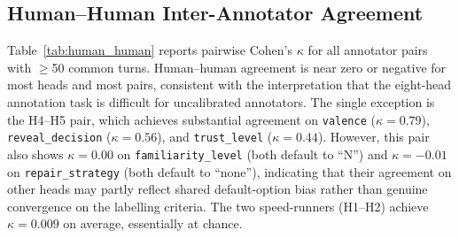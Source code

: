\documentclass[11pt]{article}
\begin{document}
\begin{table}[tp]
\centering
\caption{Per-annotator human--LLM-label agreement ($\kappa$). H1--H4 annotated 150 turns; H5 annotated 82. Best $\kappa$ per head is \textbf{bolded}.}
\label{tab:human_teacher}
\footnotesize\setlength{\tabcolsep}{2pt}
\end{table}

\subsection{Human--Human Inter-Annotator Agreement}

Table~\ref{tab:human_human} reports pairwise Cohen's $\kappa$ for all annotator pairs with $\geq$50 common turns.
Human--human agreement is near zero or negative for most heads and most pairs, consistent with the interpretation that the eight-head annotation task is difficult for uncalibrated annotators.
The single exception is the H4--H5 pair, which achieves substantial agreement on \texttt{valence} ($\kappa{=}0.79$), \texttt{reveal\_decision} ($\kappa{=}0.56$), and \texttt{trust\_level} ($\kappa{=}0.44$).
However, this pair also shows $\kappa{=}0.00$ on \texttt{familiarity\_level} (both default to ``N'') and $\kappa{=}-0.01$ on \texttt{repair\_strategy} (both default to ``none''), indicating that their agreement on other heads may partly reflect shared default-option bias rather than genuine convergence on the labelling criteria.
The two speed-runners (H1--H2) achieve $\kappa{=}0.009$ on average, essentially at chance.
\end{document}
